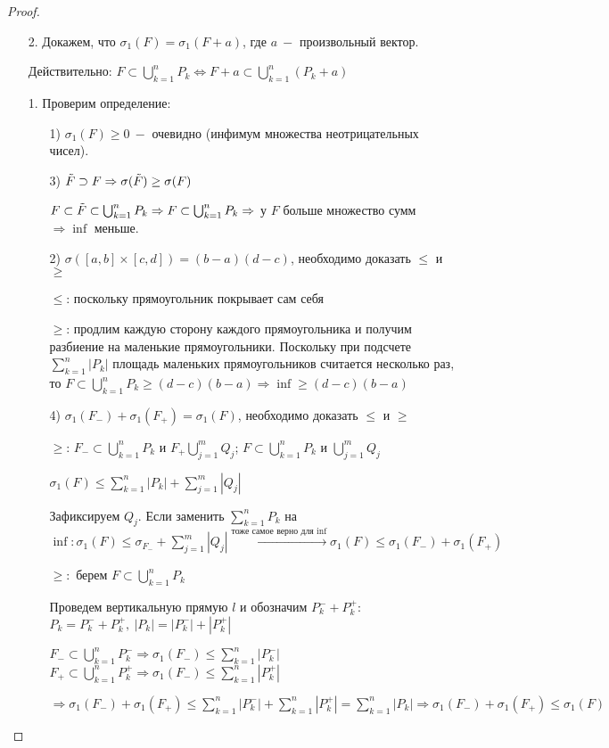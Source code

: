 \begin{proof}
    \begin{enumerate}
        \item[2.] Докажем, что $\sigma_1(F)=\sigma_1(F+a)$, где $a\ -$ произвольный вектор.

        Действительно: $F\subset  \bigcup_{k=1}^n P_k \Leftrightarrow F+a\subset  \bigcup_{k=1}^n (P_k+a)$
        
        \item[1.] Проверим определение:
        \begin{enumerate}
            \item[1)] $\sigma_1(F)\geq 0\ -$ очевидно (инфимум множества неотрицательных чисел).
            \item[3)] $\Tilde{F}\supset F\Rightarrow \sigma(\Tilde{F})\geq \sigma(F)$

            $F\subset\Tilde{F}\subset \bigcup_{k=1}^n P_k\Rightarrow F\subset \bigcup_{k=1}^n P_k\Rightarrow $ у $F$ больше множество сумм $\Rightarrow\inf$ меньше.
            \item[2)] $\sigma([a,b]\times [c,d])=(b-a)(d-c)$, необходимо доказать $\leq$ и $\geq$

            $\leq$: поскольку прямоугольник покрывает сам себя

            $\geq$: продлим каждую сторону каждого прямоугольника и получим разбиение на маленькие прямоугольники. Поскольку при подсчете $\sum\limits_{k=1}^n|P_k|$ площадь маленьких прямоугольников считается несколько раз, то $F\subset \bigcup_{k=1}^n P_k\geq (d-c)(b-a)\Rightarrow \inf \geq (d-c)(b-a)$
            \item[4)] $\sigma_1(F_-)+\sigma_1(F_+)=\sigma_1(F)$, необходимо доказать $\leq$ и $\geq$

            $\geq$: $F_-\subset \bigcup_{k=1}^n P_k$ и $F_+ \bigcup_{j=1}^m Q_j$; $F\subset \bigcup_{k=1}^n P_k$ и $\bigcup_{j=1}^m Q_j$

            $\sigma_1(F)\leq \sum\limits_{k=1}^n|P_k|+\sum\limits_{j=1}^m|Q_j|$

            Зафиксируем $Q_j$. Если заменить $\sum\limits_{k=1}^n P_k$ на $\inf:\sigma_1(F)\leq \sigma_{F_-}+\sum\limits_{j=1}^m|Q_j|\overset{\text{тоже самое верно для $\inf$}}{\rightarrow}\sigma_1(F)\leq \sigma_1(F_-)+\sigma_1(F_+)$
            
            $\geq:$ берем $F\subset \bigcup_{k=1}^n P_k$

             Проведем вертикальную прямую $l$ и обозначим $P_k^-+P_k^+:$ $P_k=P^-_k+P_k^+,\ |P_k|=|P^-_k|+|P_k^+|$

             $F_-\subset \bigcup_{k=1}^n P_k^-\Rightarrow \sigma_1(F_-)\leq \sum\limits_{k=1}^n|P_k^-|$
             $F_+\subset \bigcup_{k=1}^n P_k^+\Rightarrow \sigma_1(F_-)\leq \sum\limits_{k=1}^n|P_k^+|$

             $\Rightarrow \sigma_1(F_-)+\sigma_1(F_+)\leq \sum\limits_{k=1}^n|P_k^-|+\sum\limits_{k=1}^n|P_k^+|=\sum\limits_{k=1}^n|P_k|\Rightarrow \sigma_1(F_-)+\sigma_1(F_+)\leq\sigma_1(F)$ 
        \end{enumerate}
    \end{enumerate}
\end{proof}

